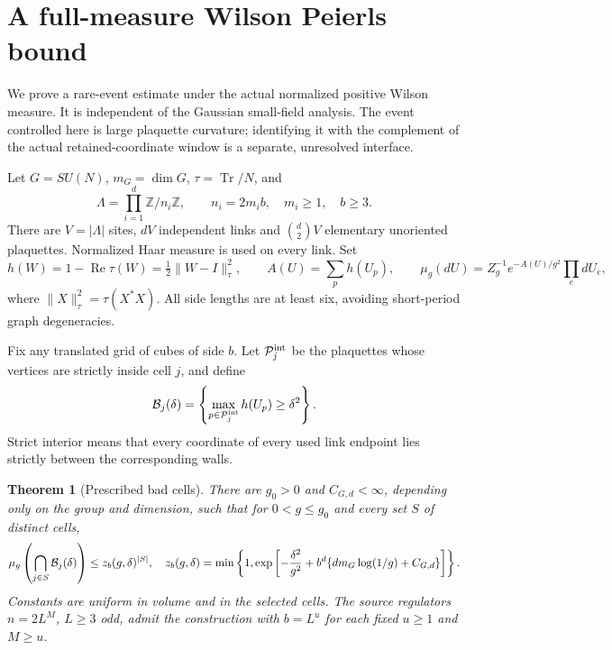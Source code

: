 \documentclass[11pt]{article}
\newtheorem{theorem}{Theorem}[section]
\theoremstyle{remark}
\begin{document}
\section{A full-measure Wilson Peierls bound}
\label{fwp-section}

We prove a rare-event estimate under the actual normalized positive
Wilson measure. It is independent of the Gaussian small-field analysis.
The event controlled here is large plaquette curvature; identifying it
with the complement of the actual retained-coordinate window is a
separate, unresolved interface.

Let \(G=SU(N)\), \(m_G=\dim G\), \(\tau=\operatorname{Tr}/N\), and
\[
 \Lambda=\prod_{i=1}^d\mathbb Z/n_i\mathbb Z,\qquad
 n_i=2m_i b,\quad m_i\ge1,\quad b\ge3.
\]
There are \(V=|\Lambda|\) sites, \(dV\) independent links and
\(\binom d2V\) elementary unoriented plaquettes. Normalized Haar measure
is used on every link. Set
\begin{equation}
 h(W)=1-\operatorname{Re}\tau(W)
       =\tfrac12\|W-I\|_\tau^2,\qquad
 A(U)=\sum_p h(U_p),\qquad
 \mu_g(dU)=Z_g^{-1}e^{-A(U)/g^2}\prod_e dU_e,
 \label{fwp-measure}
\end{equation}
where \(\|X\|_\tau^2=\tau(X^*X)\).
All side lengths are at least six, avoiding short-period graph
degeneracies.

Fix any translated grid of cubes of side \(b\).
Let \({\cal P}_j^{\rm int}\) be the plaquettes whose vertices are strictly
inside cell \(j\), and define
\begin{equation}
 {\cal B}_j(\delta)
 =\left\{\max_{p\in{\cal P}_j^{\rm int}}h(U_p)\ge\delta^2\right\}.
 \label{fwp-event}
\end{equation}
Strict interior means that every coordinate of every used link endpoint
lies strictly between the corresponding walls.

\begin{theorem}[Prescribed bad cells]
\label{fwp-main}
There are \(g_0>0\) and \(C_{G,d}<\infty\), depending only on the group
and dimension, such that for \(0<g\le g_0\) and every set \(S\) of
distinct cells,
\begin{equation}
 \mu_g\left(\bigcap_{j\in S}{\cal B}_j(\delta)\right)
 \le z_b(g,\delta)^{|S|},
 \quad
 z_b(g,\delta)=
 \min\left\{1,
 \exp\left[-\frac{\delta^2}{g^2}
     +b^d\{d m_G\log(1/g)+C_{G,d}\}\right]\right\}.
 \label{fwp-main-bound}
\end{equation}
Constants are uniform in volume and in the selected cells. The source
regulators \(n=2L^M\), \(L\ge3\) odd, admit the construction with
\(b=L^u\) for each fixed \(u\ge1\) and \(M\ge u\).
\end{theorem}
\end{document}
